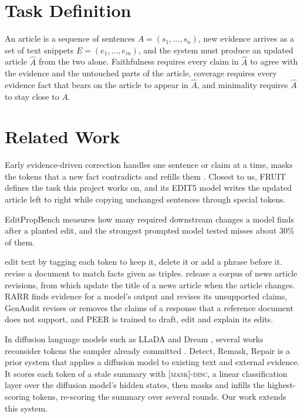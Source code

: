 \documentclass[11pt]{article}
\newcommand{\maskdisc}{\textsc{[mask]-disc}}
\begin{document}
\section{Task Definition}
\label{sec:problem}

An article is a sequence of sentences $A = (s_1, \dots, s_n)$, new evidence arrives as a set of text snippets $E = (e_1, \dots, e_m)$, and the system must produce an updated article $\hat{A}$ from the two alone. Faithfulness requires every claim in $\hat{A}$ to agree with the evidence and the untouched parts of the article, coverage requires every evidence fact that bears on the article to appear in $\hat{A}$, and minimality requires $\hat{A}$ to stay close to $A$.

\section{Related Work}
\label{sec:related}

Early evidence-driven correction handles one sentence or claim at a time, masks the tokens that a new fact contradicts and refills them \citep{shah-etal-2020-automatic, thorne-vlachos-2021-evidence}. Closest to us, FRUIT \citep{iv-etal-2022-fruit} defines the task this project works on, and its EDIT5 model writes the updated article left to right while copying unchanged sentences through special tokens.

EditPropBench \citep{kruthof-2026-editpropbench} measures how many required downstream changes a model finds after a planted edit, and the strongest prompted model tested misses about 30\% of them.

\citet{malmi-etal-2019-encode} edit text by tagging each token to keep it, delete it or add a phrase before it. \citet{iso-etal-2020-fact} revise a document to match facts given as triples. \citet{spangher-etal-2022-newsedits} release a corpus of news article revisions, from which \citet{panthaplackel-etal-2022-updated} update the title of a news article when the article changes. RARR \citep{gao-etal-2023-rarr} finds evidence for a model's output and revises its unsupported claims, GenAudit \citep{krishna-etal-2024-genaudit} revises or removes the claims of a response that a reference document does not support, and PEER \citep{schick-etal-2022-peer} is trained to draft, edit and explain its edits.

In diffusion language models such as LLaDA \citep{nie-etal-2025-llada} and Dream \citep{ye-etal-2025-dream}, several works reconsider tokens the sampler already committed \citep{wang-etal-2025-remasking, bie-etal-2026-llada21}. Detect, Remask, Repair \citep[DRR;][]{zou-etal-2026-detect} is a prior system that applies a diffusion model to existing text and external evidence. It scores each token of a stale summary with \maskdisc{}, a linear classification layer over the diffusion model's hidden states, then masks and infills the highest-scoring tokens, re-scoring the summary over several rounds. Our work extends this system.
\end{document}
